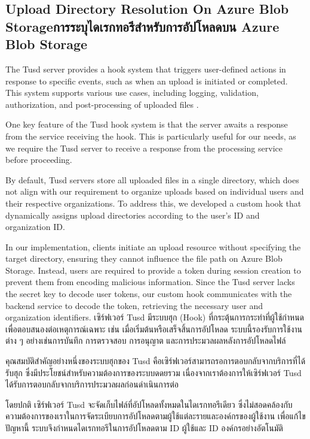 \subsection{\ifenglish Upload Directory Resolution On Azure Blob Storage\else การระบุไดเรกทอรีสำหรับการอัปโหลดบน Azure Blob Storage\fi}

\ifenglish
The Tusd server provides a hook system that triggers user-defined actions in response to specific events, such as when an upload is initiated or completed. This system supports various use cases, including logging, validation, authorization, and post-processing of uploaded files \cite{tusd-hooks-doc}.

One key feature of the Tusd hook system is that the server awaits a response from the service receiving the hook. This is particularly useful for our needs, as we require the Tusd server to receive a response from the processing service before proceeding.

By default, Tusd servers store all uploaded files in a single directory, which does not align with our requirement to organize uploads based on individual users and their respective organizations. To address this, we developed a custom hook that dynamically assigns upload directories according to the user's ID and organization ID.

In our implementation, clients initiate an upload resource without specifying the target directory, ensuring they cannot influence the file path on Azure Blob Storage. Instead, users are required to provide a token during session creation to prevent them from encoding malicious information. Since the Tusd server lacks the secret key to decode user tokens, our custom hook communicates with the backend service to decode the token, retrieving the necessary user and organization identifiers.
\else
เซิร์ฟเวอร์ Tusd มีระบบฮุก (Hook) ที่กระตุ้นการกระทำที่ผู้ใช้กำหนดเพื่อตอบสนองต่อเหตุการณ์เฉพาะ เช่น เมื่อเริ่มต้นหรือเสร็จสิ้นการอัปโหลด ระบบนี้รองรับการใช้งานต่าง ๆ อย่างเช่นการบันทึก การตรวจสอบ การอนุญาต และการประมวลผลหลังการอัปโหลดไฟล์ \cite{tusd-hooks-doc}

คุณสมบัติสำคัญอย่างหนึ่งของระบบฮุกของ Tusd คือเซิร์ฟเวอร์สามารถรอการตอบกลับจากบริการที่ได้รับฮุก ซึ่งมีประโยชน์สำหรับความต้องการของระบบดดยรวม เนื่องจากเราต้องการให้เซิร์ฟเวอร์ Tusd ได้รับการตอบกลับจากบริการประมวลผลก่อนดำเนินการต่อ

โดยปกติ เซิร์ฟเวอร์ Tusd จะจัดเก็บไฟล์ที่อัปโหลดทั้งหมดในไดเรกทอรีเดียว ซึ่งไม่สอดคล้องกับความต้องการของเราในการจัดระเบียบการอัปโหลดตามผู้ใช้แต่ละรายและองค์กรของผู้ใช้งาน เพื่อแก้ไขปัญหานี้ ระบบจึงกำหนดไดเรกทอรีในการอัปโหลดตาม ID ผู้ใช้และ ID องค์กรอย่างอัตโนมัติ


